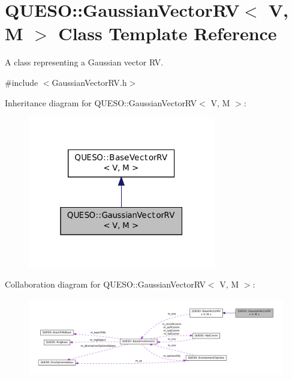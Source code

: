 \hypertarget{class_q_u_e_s_o_1_1_gaussian_vector_r_v}{\section{Q\-U\-E\-S\-O\-:\-:Gaussian\-Vector\-R\-V$<$ V, M $>$ Class Template Reference}
\label{class_q_u_e_s_o_1_1_gaussian_vector_r_v}
}


A class representing a Gaussian vector R\-V.  




{\ttfamily \#include $<$Gaussian\-Vector\-R\-V.\-h$>$}



Inheritance diagram for Q\-U\-E\-S\-O\-:\-:Gaussian\-Vector\-R\-V$<$ V, M $>$\-:
\nopagebreak
\begin{figure}[H]
\begin{center}
\leavevmode
\includegraphics[width=232pt]{class_q_u_e_s_o_1_1_gaussian_vector_r_v__inherit__graph}
\end{center}
\end{figure}


Collaboration diagram for Q\-U\-E\-S\-O\-:\-:Gaussian\-Vector\-R\-V$<$ V, M $>$\-:
\nopagebreak
\begin{figure}[H]
\begin{center}
\leavevmode
\includegraphics[width=350pt]{class_q_u_e_s_o_1_1_gaussian_vector_r_v__coll__graph}
\end{center}
\end{figure}
